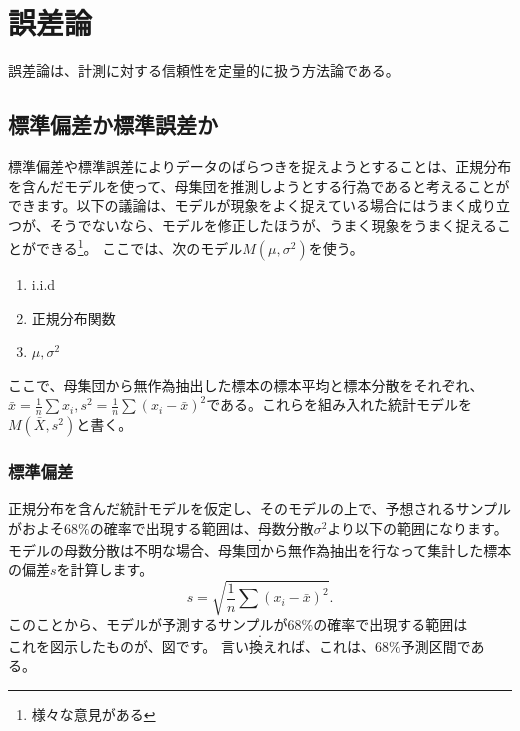
\chapter{誤差論}
誤差論は、計測に対する信頼性を定量的に扱う方法論である。

\section{標準偏差か標準誤差か}
標準偏差や標準誤差によりデータのばらつきを捉えようとすることは、正規分布を含んだモデルを使って、母集団を推測しようとする行為であると考えることができます。以下の議論は、モデルが現象をよく捉えている場合にはうまく成り立つが、そうでないなら、モデルを修正したほうが、うまく現象をうまく捉えることができる\footnote{様々な意見がある\cite{SUZUKI_SESD,池田郁男2013統計検定を理解せずに使っている人のために,池田郁男2019改訂増補版}}。
ここでは、次のモデル$M(\mu,\sigma^2)$を使う。

\begin{enumerate}
    \item i.i.d
    \item 正規分布関数
    \item $\mu,\sigma^2$
\end{enumerate}
ここで、母集団から無作為抽出した標本の標本平均と標本分散をそれぞれ、$\bar{x}=\frac{1}{n}\sum{x_i},s^2=\frac{1}{n}\sum(x_i-\bar{x})^2$である。これらを組み入れた統計モデルを$M(\bar{X},s^2)$と書く。

\subsection{標準偏差}
正規分布を含んだ統計モデルを仮定し、そのモデルの上で、予想されるサンプルがおよそ$68\%$の確率で出現する範囲は、母数分散$\sigma^2$より以下の範囲になります。
\begin{equation*}
    [\mu-\sigma,\mu+\sigma].
\end{equation*}
モデルの母数分散は不明な場合、母集団から無作為抽出を行なって集計した標本の偏差$s$を計算します。
\begin{equation*}
    s = \sqrt{\frac{1}{n}\sum(x_i-\bar{x})^2}.
\end{equation*}
このことから、モデルが予測するサンプルが$68\%$の確率で出現する範囲は
\begin{equation*}
    [\mu-s,\mu+s].
\end{equation*}
これを図示したものが、図です。
言い換えれば、これは、$68\%$予測区間である。


